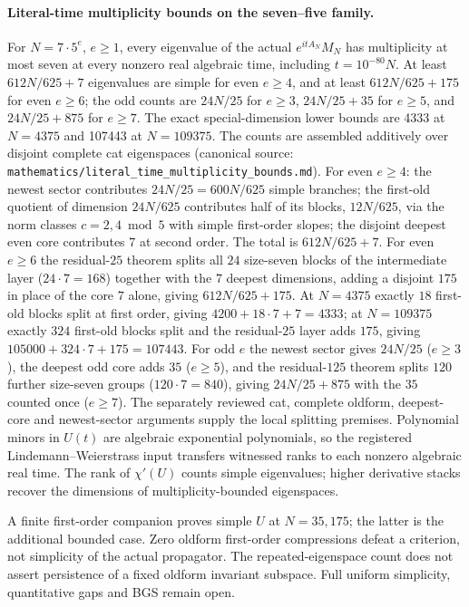 \paragraph{Literal-time multiplicity bounds on the seven--five family.}
For $N=7\cdot5^e$, $e\ge1$, every eigenvalue of the actual $e^{itA_N}M_N$
has multiplicity at most seven at every nonzero real algebraic time,
including $t=10^{-80}N$. At least $612N/625+7$ eigenvalues are simple for even
$e\ge4$, and at least $612N/625+175$ for even $e\ge6$; the odd counts are $24N/25$ for $e\ge3$,
$24N/25+35$ for $e\ge5$, and $24N/25+875$ for $e\ge7$. The exact special-dimension lower bounds are
4333 at $N=4375$ and 107443 at $N=109375$.
The counts are assembled additively over disjoint complete cat eigenspaces
(canonical source: \texttt{mathematics/literal\_time\_multiplicity\_bounds.md}).
For even $e\ge4$: the newest sector contributes $24N/25=600N/625$ simple
branches; the first-old quotient of dimension $24N/625$ contributes half of
its blocks, $12N/625$, via the norm classes $c=2,4\bmod 5$ with simple
first-order slopes; the disjoint deepest even core contributes $7$ at
second order. The total is $612N/625+7$. For even $e\ge6$ the
residual-$25$ theorem splits all $24$ size-seven blocks of the intermediate
layer ($24\cdot7=168$) together with the $7$ deepest dimensions, adding a
disjoint $175$ in place of the core $7$ alone, giving $612N/625+175$.
At $N=4375$ exactly $18$ first-old blocks split at first order, giving
$4200+18\cdot7+7=4333$; at $N=109375$ exactly $324$ first-old blocks split
and the residual-$25$ layer adds $175$, giving
$105000+324\cdot7+175=107443$. For odd $e$ the newest sector gives
$24N/25$ ($e\ge3$), the deepest odd core adds $35$ ($e\ge5$), and the
residual-$125$ theorem splits $120$ further size-seven groups
($120\cdot7=840$), giving $24N/25+875$ with the $35$ counted once
($e\ge7$). The separately reviewed cat, complete oldform, deepest-core and newest-sector
arguments supply the local splitting premises. Polynomial minors in $U(t)$
are algebraic exponential polynomials, so the registered Lindemann--Weierstrass
input transfers witnessed ranks to each nonzero algebraic real time.
The rank of $\chi'(U)$ counts simple eigenvalues; higher derivative stacks
recover the dimensions of multiplicity-bounded eigenspaces.

A finite first-order companion proves simple $U$ at $N=35,175$; the latter
is the additional bounded case. Zero oldform first-order compressions defeat
a criterion, not simplicity of the actual propagator. The repeated-eigenspace
count does not assert persistence of a fixed oldform invariant subspace.
Full uniform simplicity, quantitative gaps and BGS remain open.


